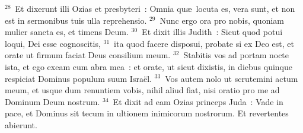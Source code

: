 ${}^{28}$~Et dixerunt illi Ozias et presbyteri~: Omnia qu\ae\ locuta es, vera sunt, et non est in sermonibus tuis ulla reprehensio.
${}^{29}$~Nunc ergo ora pro nobis, quoniam mulier sancta es, et timens Deum.
${}^{30}$~Et dixit illis Judith~: Sicut quod potui loqui, Dei esse cognoscitis,
${}^{31}$~ita quod facere disposui, probate si ex Deo est, et orate ut firmum faciat Deus consilium meum.
${}^{32}$~Stabitis vos ad portam nocte ista, et ego exeam cum abra mea~: et orate, ut sicut dixistis, in diebus quinque respiciat Dominus populum suum Isra\"el.
${}^{33}$~Vos autem nolo ut scrutemini actum meum, et usque dum renuntiem vobis, nihil aliud fiat, nisi oratio pro me ad Dominum Deum nostrum.
${}^{34}$~Et dixit ad eam Ozias princeps Juda~: Vade in pace, et Dominus sit tecum in ultionem inimicorum nostrorum. Et revertentes abierunt.

